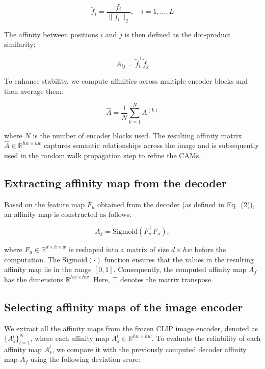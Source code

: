 \begin{equation}
\tilde{f}_i = \frac{f_i}{\| f_i \|_2}, \quad i=1,\dots,L
\end{equation}

The affinity between positions $i$ and $j$ is then defined as the dot-product similarity:  

\begin{equation}
A_{ij} = \tilde{f}_i^\top \tilde{f}_j
\end{equation}

To enhance stability, we compute affinities across multiple encoder blocks and then average them:  

\begin{equation}
\hat{A} = \frac{1}{N} \sum_{k=1}^N A^{(k)}
\end{equation}

where $N$ is the number of encoder blocks used. The resulting affinity matrix $\hat{A} \in \mathbb{R}^{hw \times hw}$ captures semantic relationships across the image and is subsequently used in the random walk propagation step to refine the CAMs.  


\subsection{Extracting affinity map from the decoder}
\label{subsec:decoder_aff_mat}
Based on the feature map $F_u$ obtained from the decoder (as defined in Eq.~(2)), an affinity map is constructed as follows:

\begin{equation}
    \label{eq: A_f}
    A_f = \text{Sigmoid}(F_u^\top F_u),
\end{equation}

where $F_u \in \mathbb{R}^{d \times h \times w}$ is reshaped into a matrix of size $d \times hw$ before the computation. The $\text{Sigmoid}(\cdot)$ function ensures that the values in the resulting affinity map lie in the range $[0, 1]$. Consequently, the computed affinity map $A_f$ has the dimensions $\mathbb{R}^{hw \times hw}$. Here, $\top$ denotes the matrix transpose.

\subsection{Selecting affinity maps of the image encoder}
\label{subsec:att_map_encoder}
We extract all the affinity maps from the frozen CLIP image encoder, denoted as $\{A_s^l\}_{l=1}^N$, where each affinity map $A_s^l \in \mathbb{R}^{hw \times hw}$. To evaluate the reliability of each affinity map $A_s^l$, we compare it with the previously computed decoder affinity map $A_f$ using the following deviation score:

